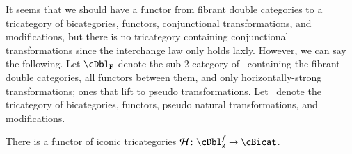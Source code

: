 \documentclass{amsart}
\begin{document}
It seems that we should have a functor from fibrant double categories
to a tricategory of bicategories, functors, conjunctional
transformations, and modifications, but there is no tricategory
containing conjunctional transformations since the interchange law
only holds laxly.  However, we can say the following.  Let $\cDbl_{\bf F}$
denote the sub-2-category of \cDbl\ containing the fibrant double
categories, all functors between them, and only horizontally-strong transformations; ones that lift to pseudo transformations. Let \cBicat\ denote the tricategory of
bicategories, functors, pseudo natural transformations, and
modifications.

\begin{thm}\label{thm:h-functor}
  There is a functor of iconic tricategories $\cH\maps \cDbl^f_g\to \cBicat$.
\end{thm}
\end{document}
